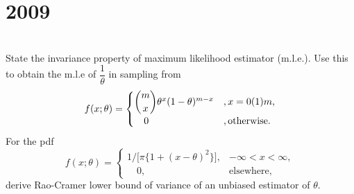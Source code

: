 \section*{2009}
\vspace{-.5cm}
\hrulefill \smallskip\\
 State the invariance property of maximum likelihood estimator (m.l.e.). Use this to obtain the m.l.e of $\dfrac{1}{\theta}$ in sampling from 
\[ f(x;\theta) = 
\begin{cases}
\dbinom{m}{x}\theta^x (1-\theta)^{m-x} &,x=0(1)m, \\
\quad0 &,\text{otherwise}.
\end{cases}
\]
\myline
{} For the pdf 
\[ f(x;\theta) = 
\begin{cases}
1/ \big[ \pi \{1 + (x-\theta)^2 \} \big], &-\infty < x < \infty,\\
\quad0 , &\text{elsewhere} ,
\end{cases} \] derive Rao-Cramer lower bound of variance of an unbiased estimator of $\theta$.